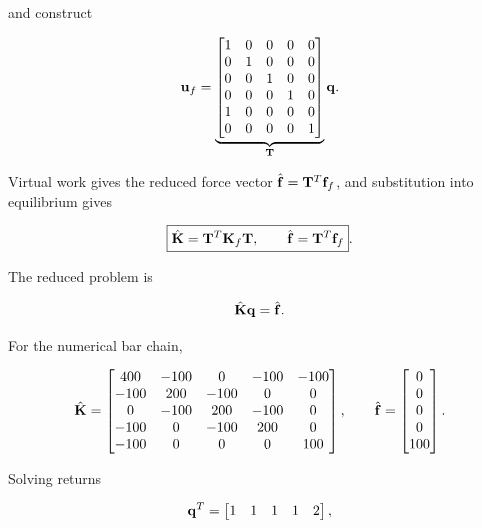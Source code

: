 and construct

\begin{equation}\label{mfc-ms-transformation}
    \mathbf{u}_f=
    \underbrace{\begin{bmatrix}
    1&0&0&0&0\\
    0&1&0&0&0\\
    0&0&1&0&0\\
    0&0&0&1&0\\
    1&0&0&0&0\\
    0&0&0&0&1
    \end{bmatrix}}_{\mathbf{T}}
    \mathbf{q}.
\end{equation}

Virtual work gives the reduced force vector $\hat{\mathbf{f}}=\mathbf{T}^T\mathbf{f}_f$,
and substitution into equilibrium gives

\begin{equation}\label{mfc-ms-modified-system}
    \boxed{
    \hat{\mathbf{K}}=\mathbf{T}^T\mathbf{K}_f\mathbf{T},
    \qquad
    \hat{\mathbf{f}}=\mathbf{T}^T\mathbf{f}_f
    }.
\end{equation}

The reduced problem is

\begin{equation}
    \hat{\mathbf{K}}\mathbf{q}=\hat{\mathbf{f}}.
\end{equation}

For the numerical bar chain,

\begin{equation}
\hat{\mathbf{K}}=
\begin{bmatrix}
400&-100&0&-100&-100\\
-100&200&-100&0&0\\
0&-100&200&-100&0\\
-100&0&-100&200&0\\
-100&0&0&0&100
\end{bmatrix},
\qquad
\hat{\mathbf{f}}=
\begin{bmatrix}0\\0\\0\\0\\100\end{bmatrix}.
\end{equation}

Solving returns

\begin{equation}
    \mathbf{q}^T=\begin{bmatrix}1&1&1&1&2\end{bmatrix},
\end{equation}

